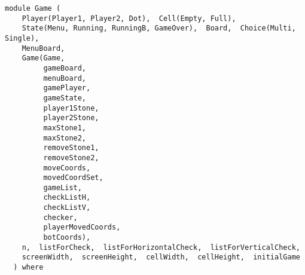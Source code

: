 \label{module:Game}
\haddockbeginheader
{\haddockverb\begin{verbatim}
module Game (
    Player(Player1, Player2, Dot),  Cell(Empty, Full), 
    State(Menu, Running, RunningB, GameOver),  Board,  Choice(Multi, Single), 
    MenuBoard, 
    Game(Game,
         gameBoard,
         menuBoard,
         gamePlayer,
         gameState,
         player1Stone,
         player2Stone,
         maxStone1,
         maxStone2,
         removeStone1,
         removeStone2,
         moveCoords,
         movedCoordSet,
         gameList,
         checkListH,
         checkListV,
         checker,
         playerMovedCoords,
         botCoords), 
    n,  listForCheck,  listForHorizontalCheck,  listForVerticalCheck, 
    screenWidth,  screenHeight,  cellWidth,  cellHeight,  initialGame
  ) where\end{verbatim}}
\haddockendheader

